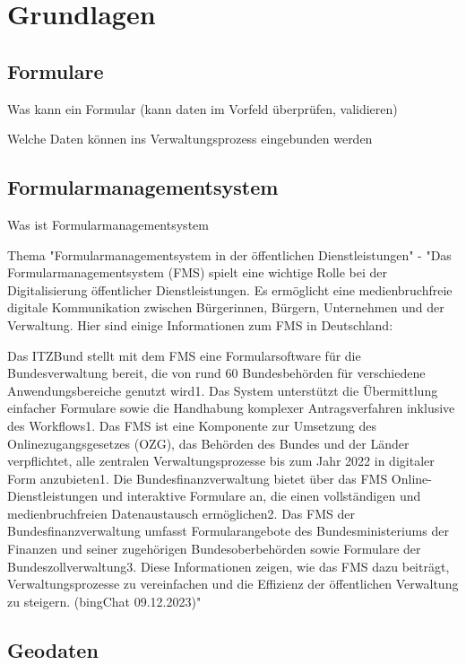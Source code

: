 \chapter{Grundlagen}
\section{Formulare}
Was kann ein Formular (kann daten im Vorfeld überprüfen, validieren)

Welche Daten können ins Verwaltungsprozess eingebunden werden
\section{Formularmanagementsystem}
Was ist Formularmanagementsystem

Thema "Formularmanagementsystem in der öffentlichen Dienstleistungen" - "Das Formularmanagementsystem (FMS) spielt eine wichtige Rolle bei der Digitalisierung öffentlicher Dienstleistungen. Es ermöglicht eine medienbruchfreie digitale Kommunikation zwischen Bürgerinnen, Bürgern, Unternehmen und der Verwaltung. Hier sind einige Informationen zum FMS in Deutschland:

Das ITZBund stellt mit dem FMS eine Formularsoftware für die Bundesverwaltung bereit, die von rund 60 Bundesbehörden für verschiedene Anwendungsbereiche genutzt wird1. Das System unterstützt die Übermittlung einfacher Formulare sowie die Handhabung komplexer Antragsverfahren inklusive des Workflows1.
Das FMS ist eine Komponente zur Umsetzung des Onlinezugangsgesetzes (OZG), das Behörden des Bundes und der Länder verpflichtet, alle zentralen Verwaltungsprozesse bis zum Jahr 2022 in digitaler Form anzubieten1.
Die Bundesfinanzverwaltung bietet über das FMS Online-Dienstleistungen und interaktive Formulare an, die einen vollständigen und medienbruchfreien Datenaustausch ermöglichen2.
Das FMS der Bundesfinanzverwaltung umfasst Formularangebote des Bundesministeriums der Finanzen und seiner zugehörigen Bundesoberbehörden sowie Formulare der Bundeszollverwaltung3.
Diese Informationen zeigen, wie das FMS dazu beiträgt, Verwaltungsprozesse zu vereinfachen und die Effizienz der öffentlichen Verwaltung zu steigern. (bingChat 09.12.2023)"
\section{Geodaten}
